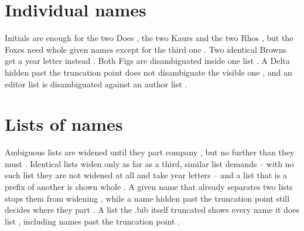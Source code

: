 \documentclass[acmsmall,nonacm,natbib=false]{acmart}
\begin{document}
\thispagestyle{empty}

\section*{Individual names}
Initials are enough for the two Does \cite{UnDoeJohn,UnDoeEdward}, the two Kaurs \cite{UnKaur,UnKaurPriya} and the two Rhos \cite{UnRhoJeanPaul,UnRhoJill}, but the Foxes need whole given names \cite{UnFoxRobert,UnFoxRita} except for the third one \cite{UnFoxSam}.
Two identical Browns get a year letter instead \cite{UnBrownFirst,UnBrownSecond}.
Both Figs are disambiguated inside one list \cite{UnFig}.
A Delta hidden past the truncation point does not disambiguate the visible one \cite{UnZulu,UnDelta}, and an editor list is disambiguated against an author list \cite{UnNutmegEditor,UnNutmegAuthor}.

\section*{Lists of names}
Ambiguous lists are widened until they part company \cite{UlVogelGarble,UlVogelTremble,UlVogelSqueeze}, but no further than they must \cite{UlPrimeLong,UlPrimeShort}.
Identical lists widen only as far as a third, similar list demands \cite{UlAshEarly,UlAshLate,UlAshPair} -- with no such list they are not widened at all and take year letters \cite{UlCoralFirst,UlCoralSecond} -- and a list that is a prefix of another is shown whole \cite{UlAckeeFirst,UlAckeeSecond,UlAckeeDill}.
A given name that already separates two lists stops them from widening \cite{UlHillJohn,UlHillJane}, while a name hidden past the truncation point still decides where they part \cite{UlOakCarl,UlOakDana}.
A list the .bib itself truncated shows every name it does list \cite{UlAlphaOthers,UlChiOthers,UlChiPhi}, including names past the truncation point \cite{UlLimeOthers,UlNib}.

\printbibliography
\end{document}
